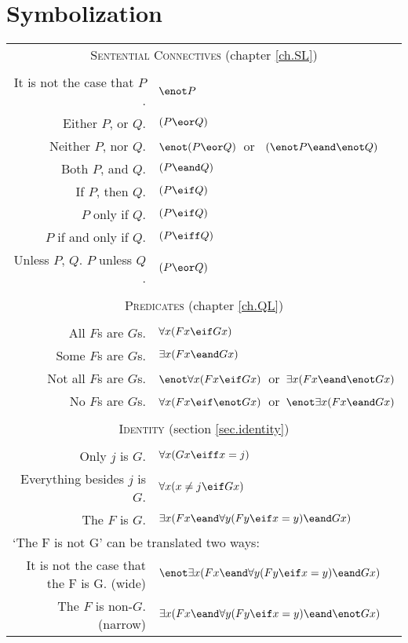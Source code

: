 \section*{Symbolization}
\begin{center}
\label{app.symbolization}
\begin{tabular*}{\textwidth}{rl}
\multicolumn{2}{c}{\textsc{Sentential Connectives} (chapter \ref{ch.SL})}\\ \\
It is not the case that $P$. & $\enot P$\\
Either $P$, or $Q$. & $(P \eor Q)$\\
Neither $P$, nor $Q$. & $\enot(P \eor Q)$\ or \ $(\enot P \eand \enot Q)$\\
Both $P$, and $Q$. & $(P \eand Q)$\\
If $P$, then $Q$. & $(P \eif Q)$\\
$P$ only if $Q$. & $(P \eif Q)$\\
$P$ if and only if $Q$. & $(P \eiff Q)$\\
Unless $P$, $Q$. $P$ unless $Q$. & $(P \eor Q)$\\
\\
\multicolumn{2}{c}{\label{SymbolizingPredicates}\textsc{Predicates} (chapter \ref{ch.QL})}\\ \\
All $F$s are $G$s. & $\forall x(Fx \eif Gx)$\\
Some $F$s are $G$s. & $\exists x(Fx \eand Gx)$\\
Not all $F$s are $G$s. & $\enot\forall x(Fx \eif Gx)$\ or\ $\exists x(Fx \eand \enot Gx)$\\
No $F$s are $G$s. & $\forall x(Fx \eif\enot Gx)$\ or\ $\enot\exists x(Fx \eand Gx)$\\
\\
\multicolumn{2}{c}{\textsc{Identity} (section \ref{sec.identity})}\\ \\
Only $j$ is $G$. & $\forall x(Gx \eiff x=j)$\\
Everything besides $j$ is $G$. & $\forall x(x \neq j \eif Gx)$\\
The $F$ is $G$. & $\exists x(Fx \eand \forall y(Fy \eif x=y) \eand Gx)$\\
\multicolumn{2}{l}{`The F is not G' can be translated two ways:} \\
It is not the case that the F is G. (wide)& $\enot\exists x(Fx \eand \forall y(Fy \eif x=y) \eand Gx)$\\
The $F$ is non-$G$. (narrow) & $\exists x(Fx \eand \forall y(Fy \eif x=y) \eand \enot Gx)$
\end{tabular*}
\end{center}






